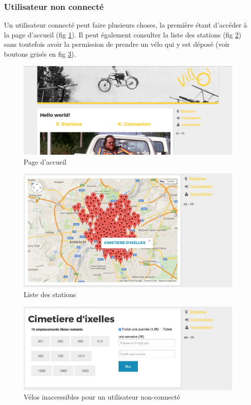 \documentclass[a4paper]{article}
\begin{document}
    \subsubsection{Utilisateur non connecté}
    Un utilisateur connecté peut faire plusieurs choses, la première étant d'accéder à la page d'accueil (fig \ref{fig-s1}). Il peut également consulter la liste des stations (fig \ref{fig-s2}) sans toutefois avoir la permission de prendre un vélo qui y est déposé (voir boutons grisés en fig \ref{fig-s3}).
    \begin{figure}
	\includegraphics[width=\textwidth]{s1.png}
    \caption{Page d'accueil}
    \label{fig-s1}
	\end{figure}
    
    \begin{figure}
	\includegraphics[width=\textwidth]{s2.png}
    \caption{Liste des stations}
    \label{fig-s2}
	\end{figure}
    
    \begin{figure}
	\includegraphics[width=\textwidth]{s3.png}
    \caption{Vélos inaccessibles pour un utilisateur non-connecté}
    \label{fig-s3}
	\end{figure}
    
\end{document}
